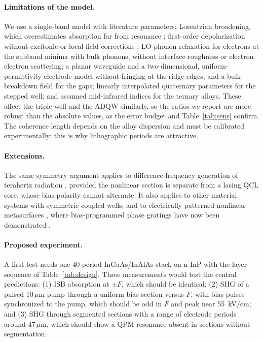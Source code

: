 \documentclass[11pt]{article}
\newcommand{\um}{\,\mu\mathrm{m}}
\begin{document}
\paragraph{Limitations of the model.} We use a single-band model with literature parameters; Lorentzian broadening, which overestimates absorption far from resonance \cite{Vurgaftman2021}; first-order depolarization without excitonic or local-field corrections \cite{Zaluzny1995,Heyman1994}; LO-phonon relaxation for electrons at the subband minima with bulk phonons, without interface-roughness or electron--electron scattering; a planar waveguide and a two-dimensional, uniform-permittivity electrode model without fringing at the ridge edges, and a bulk breakdown field for the gaps; linearly interpolated quaternary parameters for the stepped well; and assumed mid-infrared indices for the ternary alloys. These affect the triple well and the ADQW similarly, so the ratios we report are more robust than the absolute values, as the error budget and Table~\ref{tab:sens} confirm. The coherence length depends on the alloy dispersion and must be calibrated experimentally; this is why lithographic periods are attractive.

\paragraph{Extensions.} The same symmetry argument applies to difference-frequency generation of terahertz radiation \cite{Belkin2007,Fujita2018}, provided the nonlinear section is separate from a lasing QCL core, whose bias polarity cannot alternate. It also applies to other material systems with symmetric coupled wells, and to electrically patterned nonlinear metasurfaces \cite{Yu2024,Yu2025}, where bias-programmed phase gratings have now been demonstrated \cite{Yu2025}.

\paragraph{Proposed experiment.} A first test needs one 40-period InGaAs/InAlAs stack on n-InP with the layer sequence of Table~\ref{tab:design}. Three measurements would test the central predictions: (1) ISB absorption at $\pm F$, which should be identical; (2) SHG of a pulsed 10$\um$ pump through a uniform-bias section versus $F$, with bias pulses synchronized to the pump, which should be odd in $F$ and peak near 55~kV/cm; and (3) SHG through segmented sections with a range of electrode periods around 47$\um$, which should show a QPM resonance absent in sections without segmentation.
\end{document}
